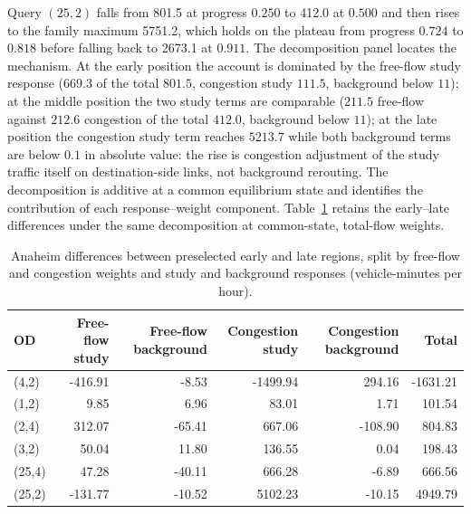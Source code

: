 Query $(25,2)$ falls from 801.5 at progress $0.250$ to 412.0 at $0.500$
and then rises to the family maximum 5751.2, which holds on the plateau
from progress $0.724$ to $0.818$ before falling back to 2673.1 at
$0.911$. The decomposition panel locates the mechanism. At the early
position the account is dominated by the free-flow study response
($669.3$ of the total $801.5$, congestion study $111.5$, background
below $11$); at the middle position the two study terms are comparable
($211.5$ free-flow against $212.6$ congestion of the total $412.0$,
background below $11$); at the late position the congestion study term
reaches $5213.7$ while both background terms are below $0.1$ in
absolute value: the rise is congestion adjustment of the study traffic
itself on destination-side links, not background rerouting. The
decomposition is additive at a common equilibrium state and identifies
the contribution of each response--weight component.
Table~\ref{tab:anaheimmechanism} retains the early--late differences
under the same decomposition at common-state, total-flow weights.
\begin{table}[t]\centering\small\caption{Anaheim differences between preselected early and late regions, split by free-flow and congestion weights and study and background responses (vehicle-minutes per hour).}\label{tab:anaheimmechanism}\begin{tabular}{lrrrrr}\toprule OD & Free-flow study & Free-flow background & Congestion study & Congestion background & Total\\\midrule
(4,2) & -416.91 & -8.53 & -1499.94 & 294.16 & -1631.21\\
(1,2) & 9.85 & 6.96 & 83.01 & 1.71 & 101.54\\
(2,4) & 312.07 & -65.41 & 667.06 & -108.90 & 804.83\\
(3,2) & 50.04 & 11.80 & 136.55 & 0.04 & 198.43\\
(25,4) & 47.28 & -40.11 & 666.28 & -6.89 & 666.56\\
(25,2) & -131.77 & -10.52 & 5102.23 & -10.15 & 4949.79\\
\bottomrule\end{tabular}\end{table}

